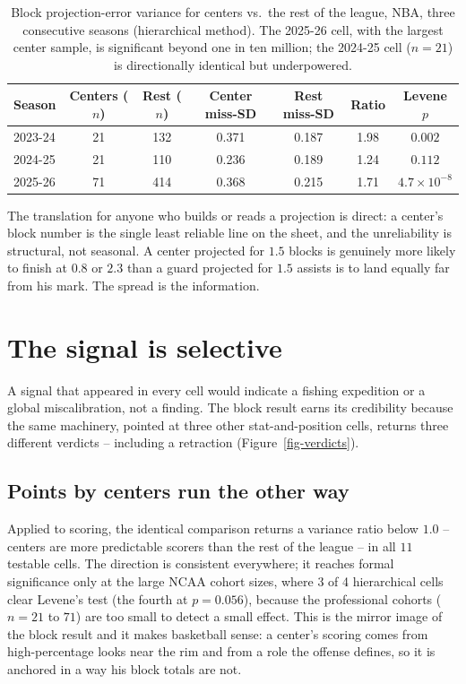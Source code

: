 \documentclass[11pt]{article}
\begin{document}
\begin{table}[h]
\centering
\caption{Block projection-error variance for centers vs.\ the rest of the
league, NBA, three consecutive seasons (hierarchical method). The 2025-26 cell,
with the largest center sample, is significant beyond one in ten million; the
2024-25 cell ($n = 21$) is directionally identical but underpowered.}
\label{tbl-crossseason}
\begin{tabular}{lcccccc}
\toprule
Season & Centers ($n$) & Rest ($n$) & Center miss-SD & Rest miss-SD & Ratio & Levene $p$ \\
\midrule
2023-24 & 21 & 132 & 0.371 & 0.187 & 1.98 & $0.002$ \\
2024-25 & 21 & 110 & 0.236 & 0.189 & 1.24 & $0.112$ \\
2025-26 & 71 & 414 & 0.368 & 0.215 & 1.71 & $4.7 \times 10^{-8}$ \\
\bottomrule
\end{tabular}
\end{table}

The translation for anyone who builds or reads a projection is direct: a center's block number is the single least reliable line on the sheet, and the unreliability is structural, not seasonal. A center projected for $1.5$ blocks is genuinely more likely to finish at $0.8$ or $2.3$ than a guard projected for $1.5$ assists is to land equally far from his mark. The spread is the information.

\section{The signal is selective}\label{sec-selective}
A signal that appeared in every cell would indicate a fishing expedition or a global miscalibration, not a finding. The block result earns its credibility because the same machinery, pointed at three other stat-and-position cells, returns three different verdicts -- including a retraction (Figure~\ref{fig-verdicts}).

\subsection{Points by centers run the other way}
Applied to scoring, the identical comparison returns a variance ratio below $1.0$ -- centers are more predictable scorers than the rest of the league -- in all $11$ testable cells. The direction is consistent everywhere; it reaches formal significance only at the large NCAA cohort sizes, where 3 of 4 hierarchical cells clear Levene's test (the fourth at $p=0.056$), because the professional cohorts ($n=21$ to $71$) are too small to detect a small effect. This is the mirror image of the block result and it makes basketball sense: a center's scoring comes from high-percentage looks near the rim and from a role the offense defines, so it is anchored in a way his block totals are not.
\end{document}
